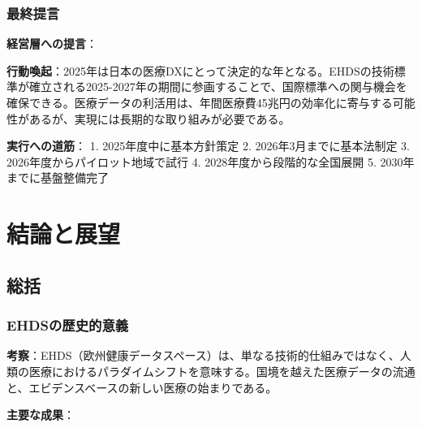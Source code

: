 \documentclass[
  a4paper,
  a4paper,
  11pt]{ltjsbook}
\begin{document}
\subsection{最終提言}\label{ux6700ux7d42ux63d0ux8a00}

\textbf{経営層への提言}：

\begin{tcolorbox}[enhanced jigsaw, toprule=.15mm, bottomtitle=1mm, coltitle=black, left=2mm, opacityback=0, arc=.35mm, colbacktitle=quarto-callout-important-color!10!white, colback=white, opacitybacktitle=0.6, bottomrule=.15mm, rightrule=.15mm, breakable, title=\textcolor{quarto-callout-important-color}{\faExclamation}\hspace{0.5em}{Important}, toptitle=1mm, titlerule=0mm, colframe=quarto-callout-important-color-frame, leftrule=.75mm]

\textbf{行動喚起}：2025年は日本の医療DXにとって決定的な年となる。EHDSの技術標準が確立される2025-2027年の期間に参画することで、国際標準への関与機会を確保できる。医療データの利活用は、年間医療費45兆円の効率化に寄与する可能性があるが、実現には長期的な取り組みが必要である。

\end{tcolorbox}

\textbf{実行への道筋}： 1. 2025年度中に基本方針策定 2.
2026年3月までに基本法制定 3. 2026年度からパイロット地域で試行 4.
2028年度から段階的な全国展開 5. 2030年までに基盤整備完了


\chapter{結論と展望}\label{ux7d50ux8ad6ux3068ux5c55ux671b}

\section{総括}\label{ux7dcfux62ec}

\subsection{EHDSの歴史的意義}\label{ehdsux306eux6b74ux53f2ux7684ux610fux7fa9}

\textbf{考察}：EHDS（欧州健康データスペース）は、単なる技術的仕組みではなく、人類の医療におけるパラダイムシフトを意味する。国境を越えた医療データの流通と、エビデンスベースの新しい医療の始まりである。

\textbf{主要な成果}：
\end{document}

